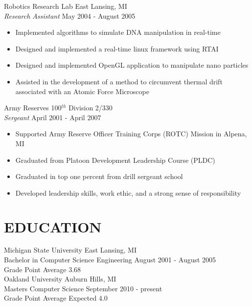 \documentclass[line]{res}
\begin{document}
\begin{resume}
    \vspace{-2mm}
    Robotics Research Lab \hfill East Lansing, MI\\
    {\sl Research Assistant} \hfill May 2004 - August 2005
    \vspace{1mm}
    \begin{itemize} 
      \item Implemented algorithms to simulate DNA manipulation in real-time
      \item Designed and implemented a real-time linux framework using RTAI
      \item Designed and implemented OpenGL application to manipulate nano particles
      \item Assisted in the development of a method to circumvent thermal drift
      associated with an Atomic Force Microscope
    \end{itemize}

    \vspace{-2mm}
    Army Reserves \hfill 100$^{th}$ Division 2/330\\
    {\sl Sergeant} \hfill April 2001 - April 2007
    \vspace{1mm}
    \begin{itemize} 
      \item Supported Army Reserve Officer Training Corps (ROTC) Mission in Alpena, MI
      \item Graduated from Platoon Development Leadership Course (PLDC)
      \item Graduated in top one percent from drill sergeant school
      \item Developed leadership skills, work ethic, and a strong sense of
      responsibility      
    \end{itemize}

\section{EDUCATION} 
\vspace{1mm}
   Michigan State University \hfill East Lansing, MI\\
   Bachelor in Computer Science Engineering \hfill August 2001 - August 2005\\
   Grade Point Average 3.68\\

   Oakland University \hfill Auburn Hills, MI\\
   Masters Computer Science \hfill September 2010 - present\\
   Grade Point Average Expected 4.0\\


\end{resume}
\end{document}
